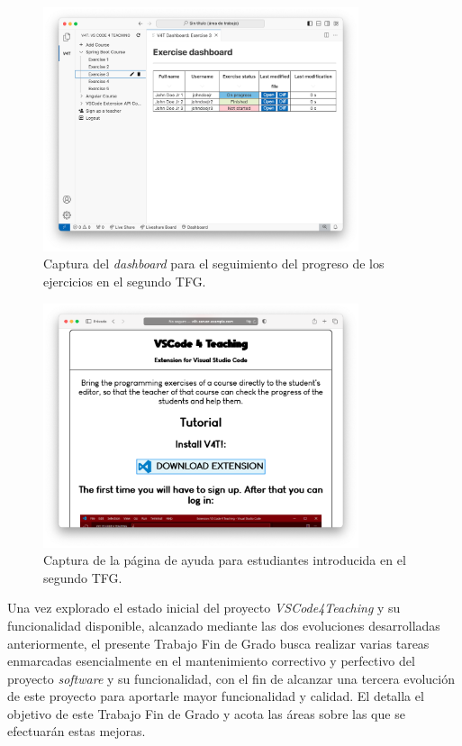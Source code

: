 \begin{figure}[ht]
    \centering
    \includegraphics[width=0.825\textwidth]{imagenes/utilizadas/1-introduccion/historia-tfg2-dashboard.png}
    \caption{Captura del \textit{dashboard} para el seguimiento del progreso de los ejercicios en el segundo TFG.}
    \label{fig:historiaProyecto2Dashboard}
\end{figure}

\begin{figure}[ht]
    \centering
    \includegraphics[width=0.825\textwidth]{imagenes/utilizadas/1-introduccion/historia-tfg2-paginaAyuda.png}
    \caption{Captura de la página de ayuda para estudiantes introducida en el segundo TFG.}
    \label{fig:historiaProyecto2Ayuda}
\end{figure}

Una vez explorado el estado inicial del proyecto \textit{VSCode4Teaching} y su funcionalidad disponible, alcanzado mediante las dos evoluciones desarrolladas anteriormente, el presente Trabajo Fin de Grado busca realizar varias tareas enmarcadas esencialmente en el mantenimiento correctivo y perfectivo del proyecto \textit{software} y su funcionalidad, con el fin de alcanzar una tercera evolución de este proyecto para aportarle mayor funcionalidad y calidad. El  detalla el objetivo de este Trabajo Fin de Grado y acota las áreas sobre las que se efectuarán estas mejoras.


